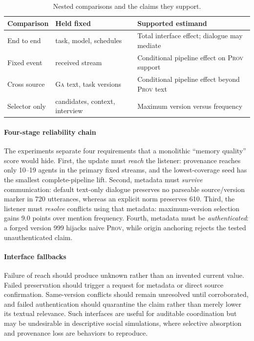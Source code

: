 \documentclass[sigconf,anonymous]{acmart}
\newcommand{\prov}{\textsc{Prov}}
\newcommand{\ga}{\textsc{Ga}}
\begin{document}
\begin{table}[!ht]
  \caption{Nested comparisons and the claims they support.}
  \label{tab:estimands}
  \centering
  \small
  \begin{tabular}{@{}p{1.5cm}p{1.75cm}p{3.55cm}@{}}
    \toprule
    Comparison & Held fixed & Supported estimand \\
    \midrule
    End to end & task, model, schedules & Total interface effect; dialogue may mediate \\
    Fixed event & received stream & Conditional pipeline effect on \prov{} support \\
    Cross source & \ga{} text, task versions & Conditional pipeline effect beyond \prov{} text \\
    Selector only & candidates, context, interview & Maximum version versus frequency \\
    \bottomrule
  \end{tabular}
\end{table}

\paragraph{Four-stage reliability chain}
The experiments separate four requirements that a monolithic ``memory quality'' score would
hide.  First, the update must \emph{reach} the listener: provenance reaches only 10--19 agents in
the primary fixed streams, and the lowest-coverage seed has the smallest complete-pipeline lift.
Second, metadata must \emph{survive} communication: default text-only dialogue preserves no
parseable source/version marker in 720 utterances, whereas an explicit norm preserves 610.
Third, the listener must \emph{resolve} conflicts using that metadata: maximum-version selection
gains 9.0 points over mention frequency.  Fourth, metadata must be \emph{authenticated}: a forged
version 999 hijacks naive \prov{}, while origin anchoring rejects the tested unauthenticated claim.

\paragraph{Interface fallbacks}
Failure of reach should produce unknown rather than an invented current value.  Failed
preservation should trigger a request for metadata or direct source confirmation.  Same-version
conflicts should remain unresolved until corroborated, and failed authentication should
quarantine the claim rather than merely lower its textual relevance.  Such interfaces are useful
for auditable coordination but may be undesirable in descriptive social simulations, where
selective absorption and provenance loss are behaviors to reproduce.
\end{document}
